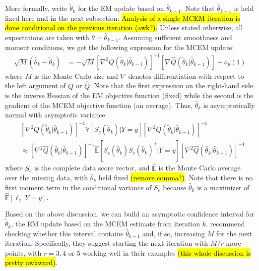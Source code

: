 \documentclass[11pt, oneside]{article}   	%
\newcommand{\bV}{\mathbb{V}}
\newcommand{\bE}{\mathbb{E}}
\newcommand{\hq}{\hat{Q}}
\begin{document}
More formally, write $\tilde{\theta}_k$ for the EM update based on $\hat{\theta}_{k-1}$. Note that $\hat{\theta}_{k-1}$ is held fixed here and in the next subsection. \hl{Analysis of a single MCEM iteration is done conditional on the previous iteration (awk?).} Unless stated otherwise, all expectations are taken with $\theta = \hat{\theta}_{k-1}$. Assuming sufficient smoothness and moment conditions, we get the following expression for the MCEM update:
%
\begin{align}
    \sqrt{M}(\hat{\theta}_k - \tilde{\theta}_k) &= - \sqrt{M} \left[ \nabla^2 Q(\tilde{\theta}_k|\hat{\theta}_{k-1})\right]^{-1} \left[\nabla \hq(\tilde{\theta}_k|\hat{\theta}_{k-1}) \right] + o_p(1) \label{eq:th_as_dist}
\end{align}
%
where $M$ is the Monte Carlo size and $\nabla$ denotes differentiation with respect to the left argument of $Q$ or $\hat{Q}$. Note that the first expression on the right-hand side is the inverse Hessian of the EM objective function (fixed) while the second is the gradient of the MCEM objective function (an average). Thus, $\hat{\theta}_k$ is asymptotically normal with asymptotic variance
%
\begin{align}
    &\left[ \nabla^2 Q(\tilde{\theta}_k|\hat{\theta}_{k-1})\right]^{-1} \bV \left[ S_c (\tilde{\theta}_k) | Y=y \right] \left[ \nabla^2 Q(\tilde{\theta}_k|\hat{\theta}_{k-1})\right]^{-1}\\
    &\approx \left[ \nabla^2 \hat{Q}(\hat{\theta}_k|\hat{\theta}_{k-1})\right]^{-1} \hat{\bE} \left[ S_c(\hat{\theta}_k) S_c(\hat{\theta}_k)^T | Y=y \right] \left[ \nabla^2 \hat{Q}(\hat{\theta}_k|\hat{\theta}_{k-1})\right]^{-1} 
\end{align}
%
where $S_c$ is the complete data score vector, and $\hat{\bE}$ is the Monte Carlo average over the missing data, with $\hat{\theta}_k$ held fixed \hl{(remove comma?)}. Note that there is no first moment term in the conditional variance of $S_c$ because $\hat{\theta}_k$ is a maximizer of $\hat{\bE} [\ell_c |Y=y]$.

Based on the above discussion, we can build an asymptotic confidence interval for $\tilde{\theta}_k$, the EM update based on the MCEM estimate from iteration $k$. \citeauthor{Boo99} recommend checking whether this interval contains $\hat{\theta}_{k-1}$ and, if so, increasing $M$ for the next iteration. Specifically, they suggest starting the next iteration with $M/r$ more points, with $r = 3,4$ or $5$ working well in their examples \hl{(this whole discussion is pretty awkward)}.
\end{document}
